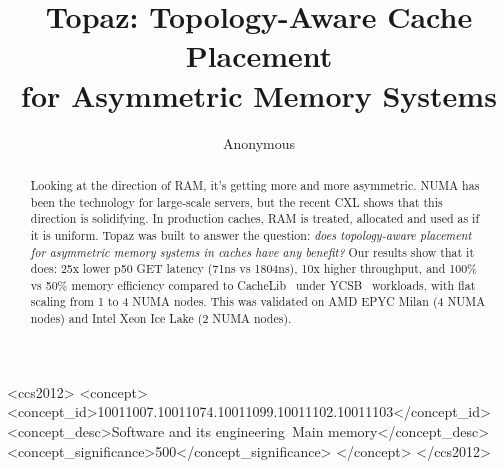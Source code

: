 \documentclass[sigplan,10pt]{acmart}
\begin{document}
\title{Topaz: Topology-Aware Cache Placement\\for Asymmetric Memory Systems}

\author{Anonymous}

\begin{abstract}
%
%
Looking at the direction of RAM, it's getting more and more asymmetric.
NUMA has been the technology for large-scale servers, but the recent CXL
shows that this direction is solidifying. In production caches, RAM is
treated, allocated and used as if it is uniform. Topaz was built to answer
the question: \emph{does topology-aware placement for asymmetric memory systems
in caches have any benefit?} Our results show that it does: 25x lower p50
GET latency (71ns vs 1804ns), 10x higher throughput, and 100\% vs 50\%
memory efficiency compared to CacheLib~\cite{cachelib} under YCSB~\cite{ycsb} workloads, with flat scaling from 1 to 4
NUMA nodes. This was validated on AMD EPYC Milan (4 NUMA nodes) and
Intel Xeon Ice Lake (2 NUMA nodes).
%
\end{abstract}

\begin{CCSXML}
<ccs2012>
<concept>
<concept_id>10011007.10011074.10011099.10011102.10011103</concept_id>
<concept_desc>Software and its engineering~Main memory</concept_desc>
<concept_significance>500</concept_significance>
</concept>
</ccs2012>
\end{CCSXML}



\maketitle
\end{document}
